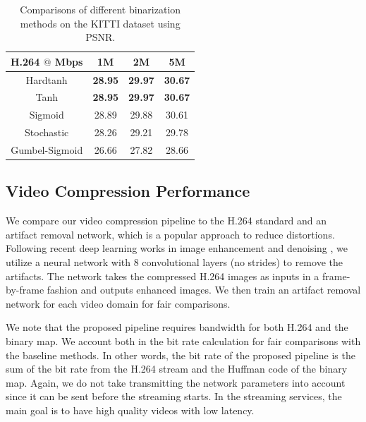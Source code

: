 \documentclass[letterpaper]{article} %
\begin{document}
\begin{table}[t]
\caption{Comparisons of different binarization methods on the KITTI dataset using PSNR.
}
\centering
\begin{tabular}{cccc}
\toprule
H.264 $@$ Mbps & 1M & 2M & 5M \\
\hline

Hardtanh & \textbf{28.95} & \textbf{29.97} & \textbf{30.67} \\
\hline

Tanh & \textbf{28.95} & \textbf{29.97} & \textbf{30.67} \\
\hline

Sigmoid & 28.89 & 29.88 & 30.61 \\
\hline

Stochastic & 28.26 & 29.21 & 29.78 \\
\hline

Gumbel-Sigmoid & 26.66 & 27.82 & 28.66 \\
\bottomrule
\end{tabular}
\label{tab:binary_psnr}
\end{table}

\subsection{Video Compression Performance}

We compare our video compression pipeline to the H.264 standard and an artifact removal network, which is a popular approach to reduce distortions. Following recent deep learning works in image enhancement and denoising \cite{Kim_CVPR_2016,Zhang_TIP_2017}, we utilize a neural network with 8 convolutional layers (no strides) to remove the artifacts. The network takes the compressed H.264 images as inputs in a frame-by-frame fashion and outputs enhanced images. We then train an artifact removal network for each video domain for fair comparisons.

We note that the proposed pipeline requires bandwidth for both H.264 and the binary map. We account both in the bit rate calculation for fair comparisons with the baseline methods. In other words, the bit rate of the proposed pipeline is the sum of the bit rate from the H.264 stream and the Huffman code of the binary map. Again, we do not take transmitting the network parameters into account since it can be sent before the streaming starts. In the streaming services, the main goal is to have high quality videos with low latency.
\end{document}
